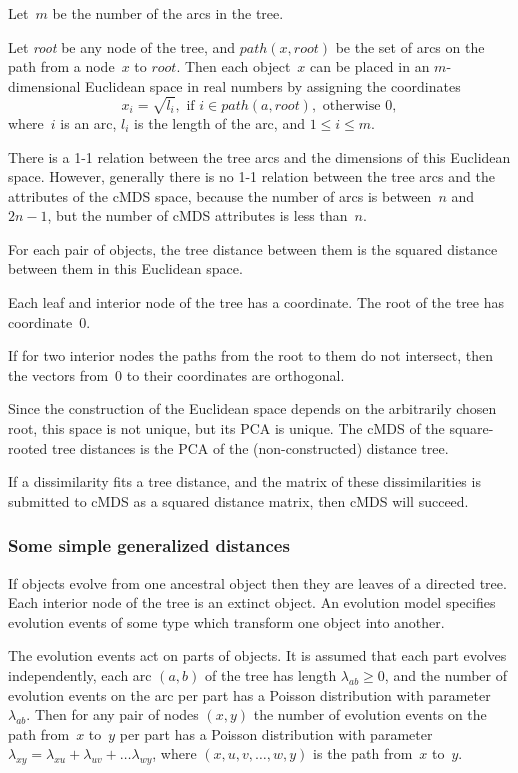 \documentclass[10pt,a4paper]{article}
\begin{document}
Let~$m$ be the number of the arcs in the tree.

Let {\em root} be any node of the tree, and $path(x,root)$ be the set of arcs on the path from a node~$x$ to $root$.
Then each object~$x$ can be placed in an $m$-dimensional Euclidean space in real numbers by assigning the coordinates
$$ x_i = \sqrt{l_i}, \text { if } i \in path(a,root), \text { otherwise } 0, $$
where~$i$ is an arc, $l_i$ is the length of the arc, and $1 \le i \le m$.

There is a 1-1 relation between the tree arcs and the dimensions of this Euclidean space.
However, generally there is no 1-1 relation between the tree arcs and the attributes of the cMDS space,
because the number of arcs is between~$n$ and $2n-1$, but the number of cMDS attributes is less than~$n$.

For each pair of objects, the tree distance between them is the squared distance between them in this Euclidean space.

Each leaf and interior node of the tree has a coordinate.
The root of the tree has coordinate~0.

If for two interior nodes the paths from the root to them do not intersect, then the vectors from~0 to their coordinates are orthogonal.

Since the construction of the Euclidean space depends on the arbitrarily chosen root, this space is not unique,
but its PCA is unique.
The cMDS of the square-rooted tree distances is the PCA of the (non-constructed) distance tree.

If a dissimilarity fits a tree distance,
and the matrix of these dissimilarities is submitted to cMDS as a squared distance matrix,
then cMDS will succeed.



\subsubsection {Some simple generalized distances}


If objects evolve from one ancestral object then they are leaves of a directed tree.
Each interior node of the tree is an extinct object.
An evolution model specifies evolution events of some type which transform one object into another.

The evolution events act on parts of objects.
It is assumed that each part evolves independently, each arc $(a,b)$ of the tree has length $\lambda_{ab} \ge 0$,
and the number of evolution events on the arc per part has a Poisson distribution with parameter $\lambda_{ab}$.
Then for any pair of nodes $(x,y)$ the number of evolution events on the path from~$x$ to~$y$ per part has a Poisson distribution with parameter
$\lambda_{xy} = \lambda_{xu} + \lambda_{uv} + \dots \lambda_{wy}$,
where $(x, u, v, \dots, w, y)$ is the path from~$x$ to~$y$.
\end{document}
